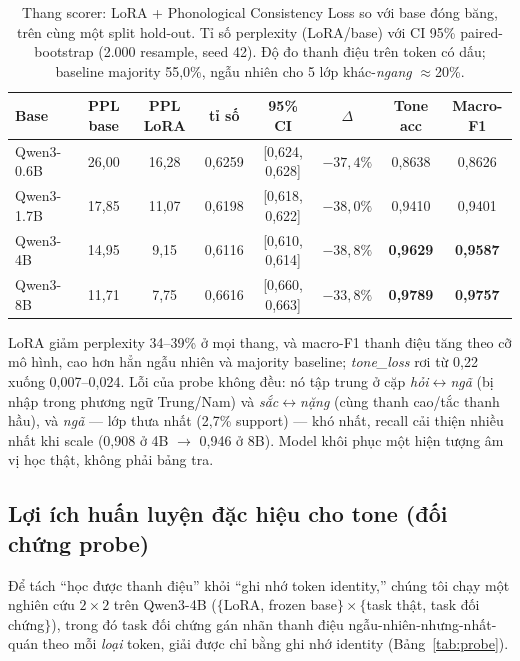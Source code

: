 \documentclass[runningheads]{llncs}
\newcommand{\tone}[1]{\textit{#1}}
\begin{document}
\begin{table}[H]
\centering
\caption{Thang scorer: LoRA + Phonological Consistency Loss so với base đóng băng, trên cùng một split hold-out. Tỉ số perplexity (LoRA/base) với CI 95\% paired-bootstrap (2.000 resample, seed 42). Độ đo thanh điệu trên token có dấu; baseline majority 55,0\%, ngẫu nhiên cho 5 lớp khác-\tone{ngang} $\approx$20\%.}
\label{tab:ladder}
\begin{tabular}{lccccccc}
\toprule
\textbf{Base} & \textbf{PPL base} & \textbf{PPL LoRA} & \textbf{tỉ số} & \textbf{95\% CI} & \textbf{$\Delta$} & \textbf{Tone acc} & \textbf{Macro-F1} \\
\midrule
Qwen3-0.6B & 26,00 & 16,28 & 0,6259 & [0,624, 0,628] & $-37{,}4\%$ & 0,8638 & 0,8626 \\
Qwen3-1.7B & 17,85 & 11,07 & 0,6198 & [0,618, 0,622] & $-38{,}0\%$ & 0,9410 & 0,9401 \\
Qwen3-4B   & 14,95 & 9,15  & 0,6116 & [0,610, 0,614] & $-38{,}8\%$ & \textbf{0,9629} & \textbf{0,9587} \\
Qwen3-8B   & 11,71 & 7,75  & 0,6616 & [0,660, 0,663] & $-33{,}8\%$ & \textbf{0,9789} & \textbf{0,9757} \\
\bottomrule
\end{tabular}
\end{table}

LoRA giảm perplexity 34--39\% ở mọi thang, và macro-F1 thanh điệu tăng theo cỡ mô hình, cao hơn hẳn ngẫu nhiên và majority baseline; \tone{tone\_loss} rơi từ 0,22 xuống 0,007--0,024. Lỗi của probe không đều: nó tập trung ở cặp \tone{hỏi}$\leftrightarrow$\tone{ngã} (bị nhập trong phương ngữ Trung/Nam) và \tone{sắc}$\leftrightarrow$\tone{nặng} (cùng thanh cao/tắc thanh hầu), và \tone{ngã} --- lớp thưa nhất (2,7\% support) --- khó nhất, recall cải thiện nhiều nhất khi scale (0,908 ở 4B $\to$ 0,946 ở 8B). Model khôi phục một hiện tượng âm vị học thật, không phải bảng tra.

\subsection{Lợi ích huấn luyện đặc hiệu cho tone (đối chứng probe)}

Để tách ``học được thanh điệu'' khỏi ``ghi nhớ token identity,'' chúng tôi chạy một nghiên cứu $2{\times}2$ trên Qwen3-4B ($\{$LoRA, frozen base$\}\times\{$task thật, task đối chứng$\}$), trong đó task đối chứng gán nhãn thanh điệu ngẫu-nhiên-nhưng-nhất-quán theo mỗi \emph{loại} token, giải được chỉ bằng ghi nhớ identity (Bảng~\ref{tab:probe}).
\end{document}
